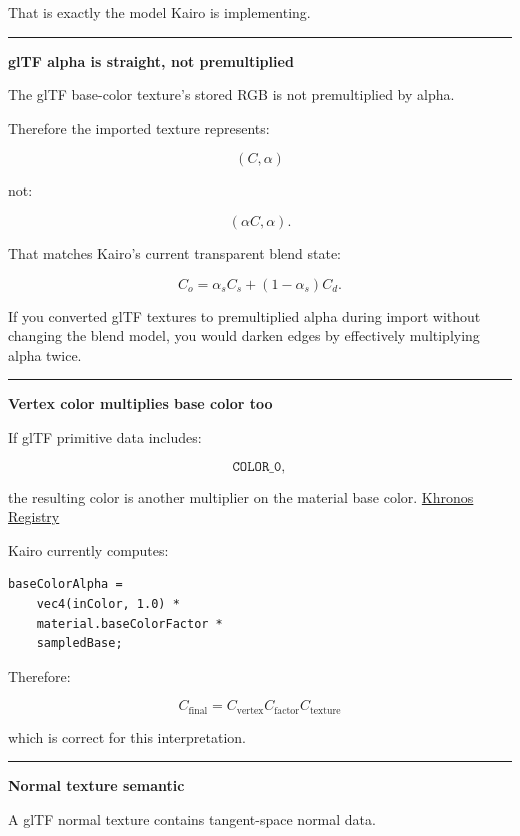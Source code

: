 That is exactly the model Kairo is implementing.

\begin{center}\rule{0.5\linewidth}{0.5pt}\end{center}

\textbf{glTF alpha is straight, not premultiplied}

The glTF base-color texture's stored RGB is not premultiplied by alpha.

Therefore the imported texture represents:

\[
(C,\alpha)
\]

not:

\[
(\alpha C,\alpha).
\]

That matches Kairo's current transparent blend state:

\[
C_o
=
\alpha_sC_s+
(1-\alpha_s)C_d.
\]

If you converted glTF textures to premultiplied alpha during import without changing the blend model, you would darken edges by effectively multiplying alpha twice.

\begin{center}\rule{0.5\linewidth}{0.5pt}\end{center}

\textbf{Vertex color multiplies base color too}

If glTF primitive data includes:

\[
\texttt{COLOR\_0},
\]

the resulting color is another multiplier on the material base color. \href{https://registry.khronos.org/glTF/specs/2.0/glTF-2.0.html?utm_source=chatgpt.com}{Khronos Registry}

Kairo currently computes:

\begin{verbatim}
baseColorAlpha =
    vec4(inColor, 1.0) *
    material.baseColorFactor *
    sampledBase;
\end{verbatim}

Therefore:

\[
\boxed{
C_{\text{final}}
=
C_{\text{vertex}}
C_{\text{factor}}
C_{\text{texture}}
}
\]

which is correct for this interpretation.

\begin{center}\rule{0.5\linewidth}{0.5pt}\end{center}

\textbf{Normal texture semantic}

A glTF normal texture contains tangent-space normal data.

